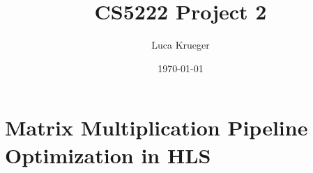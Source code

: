 \documentclass{article}
\title{CS5222 Project 2}
\author{Luca Krueger}
\date{\today}
\begin{document}
\maketitle

\section{Matrix Multiplication Pipeline Optimization in HLS}

\end{document}

